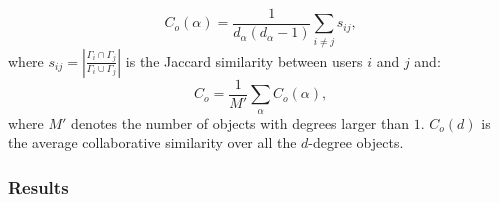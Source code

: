       \begin{equation}
        C_o(\alpha) = \frac{1}{d_\alpha(d_\alpha-1)} \sum_{i\neq j} s_{ij}\mbox{,}
      \end{equation}
      where $s_{ij} = \left| \frac{\Gamma_i \cap \Gamma_j}{\Gamma_i \cup \Gamma_j} \right|$ is the Jaccard similarity between users $i$ and $j$ and:
      \begin{equation}
        C_o = \frac{1}{M\prime} \sum_\alpha C_o(\alpha)\mbox{,}
      \end{equation}
      where $M\prime$ denotes the number of objects with degrees larger than $1$. $C_o(d)$ is the average collaborative similarity over all the $d$-degree objects.
      
    \subsubsection{Results}
    
